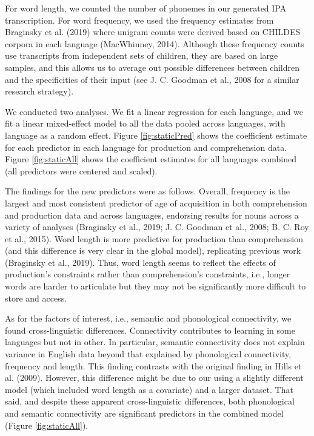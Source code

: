\documentclass[english,floatsintext,man]{apa6}
\theoremstyle{definition}
\theoremstyle{definition}
\theoremstyle{definition}
\theoremstyle{remark}
\begin{document}
For word length, we counted the number of phonemes in our generated IPA
transcription. For word frequency, we used the frequency estimates from
Braginsky et al. (2019) where unigram counts were derived based on
CHILDES corpora in each language (MacWhinney, 2014). Although these
frequency counts use transcripts from independent sets of children, they
are based on large samples, and this allows us to average out possible
differences between children and the specificities of their input (see
J. C. Goodman et al., 2008 for a similar research strategy).

We conducted two analyses. We fit a linear regression for each language,
and we fit a linear mixed-effect model to all the data pooled across
languages, with language as a random effect. Figure \ref{fig:staticPred}
shows the coefficient estimate for each predictor in each language for
production and comprehension data. Figure \ref{fig:staticAll} shows the
coefficient estimates for all languages combined (all predictors were
centered and scaled).

The findings for the new predictors were as follows. Overall, frequency
is the largest and most consistent predictor of age of acquisition in
both comprehension and production data and across languages, endorsing
results for nouns across a variety of analyses (Braginsky et al., 2019;
J. C. Goodman et al., 2008; B. C. Roy et al., 2015). Word length is more
predictive for production than comprehension (and this difference is
very clear in the global model), replicating previous work (Braginsky et
al., 2019). Thus, word length seems to reflect the effects of
production's constraints rather than comprehension's constraints, i.e.,
longer words are harder to articulate but they may not be significantly
more difficult to store and access.

As for the factors of interest, i.e., semantic and phonological
connectivity, we found cross-linguistic differences. Connectivity
contributes to learning in some languages but not in other. In
particular, semantic connectivity does not explain variance in English
data beyond that explained by phonological connectivity, frequency and
length. This finding contrasts with the original finding in Hills et al.
(2009). However, this difference might be due to our using a slightly
different model (which included word length as a covariate) and a larger
dataset. That said, and despite these apparent cross-linguistic
differences, both phonological and semantic connectivity are significant
predictors in the combined model (Figure \ref{fig:staticAll}).
\end{document}
